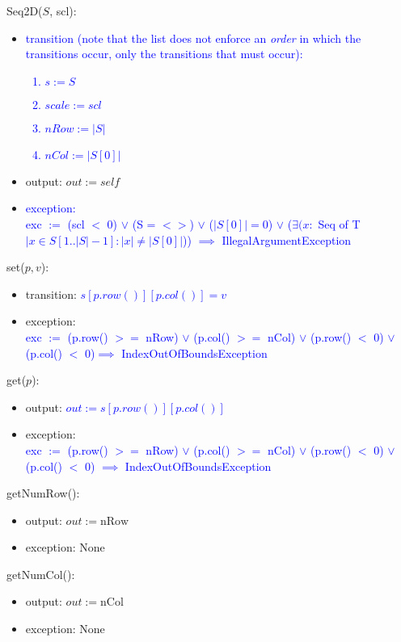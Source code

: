 \documentclass[12pt]{article}
\begin{document}
Seq2D($S$, scl):
\begin{itemize}
\item \textcolor{blue}{transition (note that the list does not enforce an \emph{order} in which the transitions occur, only the transitions that must occur): \begin{enumerate}\item $s := S$  \item $scale := scl$ \item $nRow := |S|$ \item $nCol := |S[0]|$\end{enumerate}}

\item output: $\mathit{out} := \mathit{self}$
\item \textcolor{blue}{exception: \\
exc $:=$ (scl $<$ 0) $\lor$ (S = $<>$) $\lor$ ($| S[0] | = 0$) $\lor$ ($\exists (x : $ Seq of T $| x \in S[ 1..|S|-1 ] : |x| \neq | S[0] |$)) $\implies$ IllegalArgumentException}
\end{itemize}

\noindent set($p, v$):
\begin{itemize}
\item transition: \textcolor{blue}{$s[p.row()][p.col()] = v$}
\item exception:\\ \textcolor{blue}{exc $:=$ (p.row() $ >= $ nRow) $\lor$ (p.col() $ >= $ nCol) $\lor$ (p.row() $ < $ 0) $\lor$ (p.col() $ < $ 0)$\implies$ IndexOutOfBoundsException}
\end{itemize}

\noindent get($p$):
\begin{itemize}
\item output: \textcolor{blue}{$out := s[p.row()][p.col()]$}
\item exception:\\ \textcolor{blue}{exc $:=$ (p.row() $ >= $ nRow) $\lor$ (p.col() $ >= $ nCol) $\lor$ (p.row() $ < $ 0) $\lor$ (p.col() $ < $ 0) $\implies$ IndexOutOfBoundsException}
\end{itemize}

\noindent getNumRow():
\begin{itemize}
\item output: $out := \mbox{nRow}$
\item exception: None
\end{itemize}

\noindent getNumCol():
\begin{itemize}
\item output: $out := \mbox{nCol}$
\item exception: None
\end{itemize}
\end{document}
